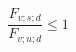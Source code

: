 \documentclass[12pt]{article}
\begin{document}
\begin{displaymath}
\frac {F_{v;s;d}} {F_{v;u;d}} \leq 1
\end{displaymath}
\end{document}
